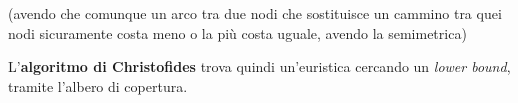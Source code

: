 \begin{esempio}
\begin{figure}[h!]
												      		\end{figure}
												      		(avendo che comunque un arco tra due nodi che sostituisce un cammino tra quei
												      		nodi sicuramente costa meno o la più costa uguale, avendo la semimetrica)
												      	\end{esempio}
												      	L'\textbf{algoritmo di Christofides} trova quindi un'euristica cercando un
												      	\textit{lower bound}, tramite l'albero di copertura.\\
